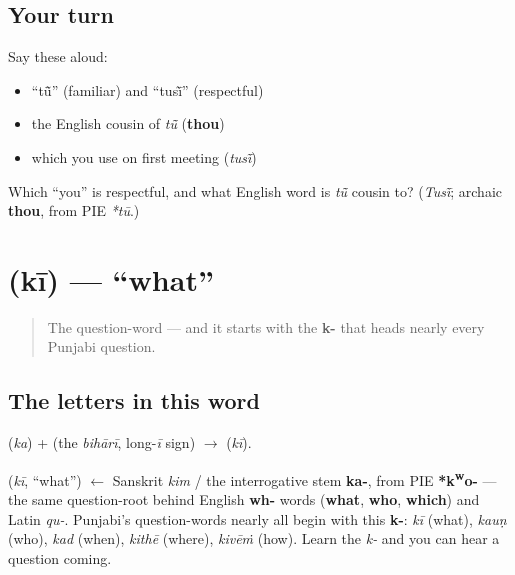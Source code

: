 \subsection*{Your turn}
Say these aloud:

\begin{itemize}
\raggedright
  \item \textquotedblleft{}tū̃\textquotedblright{} (familiar) and \textquotedblleft{}tusī̃\textquotedblright{} (respectful)
  \item the English cousin of \emph{tū̃} (\textbf{thou})
  \item which you use on first meeting (\emph{tusī̃})
\end{itemize}

\begin{tcolorbox}[breakable,colback=teal!4,colframe=teal!35!black,title={Before you move on}]
Which \textquotedblleft{}you\textquotedblright{} is respectful, and what English word is \emph{tū̃} cousin to? (\emph{Tusī̃}; archaic \textbf{thou}, from PIE \emph{*tū}.)
\end{tcolorbox}
\section[\texorpdfstring{\pa{ਕੀ} (kī)}{ਕੀ (kī)}]{ (kī) — \textquotedblleft{}what\textquotedblright{}}

\label{lesson:PA-C02-ki}



\begin{quote}
The question-word — and it starts with the \textbf{k-} that heads nearly every Punjabi question.
\end{quote}

\subsection*{The letters in this word}
\textbf{} (\emph{ka}) + \textbf{} (the \emph{bihārī}, long-\emph{ī} sign) $\to$ \textbf{} (\emph{kī}).

\begin{cousinweb}
\textbf{} (\emph{kī}, \textquotedblleft{}what\textquotedblright{}) $\leftarrow$ Sanskrit \emph{kim} / the interrogative stem \textbf{ka-}, from PIE \textbf{*k\textsuperscript{w}o-} — the same question-root behind English \textbf{wh-} words (\textbf{what}, \textbf{who}, \textbf{which}) and Latin \emph{qu-}. Punjabi's question-words nearly all begin with this \textbf{k-}: \emph{kī} (what), \emph{kauṇ} (who), \emph{kad} (when), \emph{kithē} (where), \emph{kivēṁ} (how). Learn the \emph{k-} and you can hear a question coming.
\end{cousinweb}

